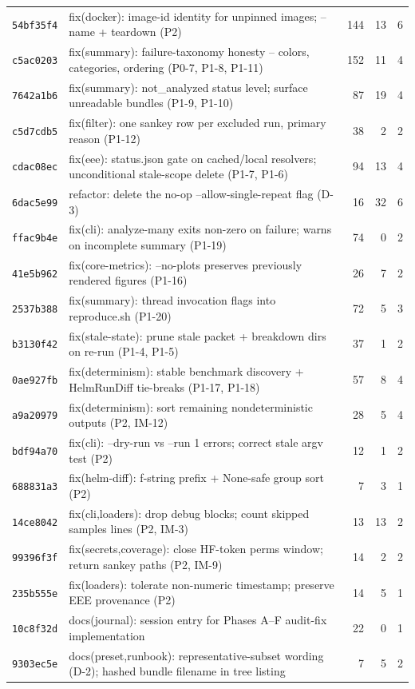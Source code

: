 \begin{longtable}{@{}p{}p{}r r r@{}}
\texttt{54bf35f4} & fix(docker): image-id identity for unpinned images; --name + teardown (P2) & 144 & 13 & 6 \\
\texttt{c5ac0203} & fix(summary): failure-taxonomy honesty -- colors, categories, ordering (P0-7, P1-8, P1-11) & 152 & 11 & 4 \\
\texttt{7642a1b6} & fix(summary): not\_analyzed status level; surface unreadable bundles (P1-9, P1-10) & 87 & 19 & 4 \\
\texttt{c5d7cdb5} & fix(filter): one sankey row per excluded run, primary reason (P1-12) & 38 & 2 & 2 \\
\texttt{cdac08ec} & fix(eee): status.json gate on cached/local resolvers; unconditional stale-scope delete (P1-7, P1-6) & 94 & 13 & 4 \\
\texttt{6dac5e99} & refactor: delete the no-op --allow-single-repeat flag (D-3) & 16 & 32 & 6 \\
\texttt{ffac9b4e} & fix(cli): analyze-many exits non-zero on failure; warns on incomplete summary (P1-19) & 74 & 0 & 2 \\
\texttt{41e5b962} & fix(core-metrics): --no-plots preserves previously rendered figures (P1-16) & 26 & 7 & 2 \\
\texttt{2537b388} & fix(summary): thread invocation flags into reproduce.sh (P1-20) & 72 & 5 & 3 \\
\texttt{b3130f42} & fix(stale-state): prune stale packet + breakdown dirs on re-run (P1-4, P1-5) & 37 & 1 & 2 \\
\texttt{0ae927fb} & fix(determinism): stable benchmark discovery + HelmRunDiff tie-breaks (P1-17, P1-18) & 57 & 8 & 4 \\
\texttt{a9a20979} & fix(determinism): sort remaining nondeterministic outputs (P2, IM-12) & 28 & 5 & 4 \\
\texttt{bdf94a70} & fix(cli): --dry-run vs --run 1 errors; correct stale argv test (P2) & 12 & 1 & 2 \\
\texttt{688831a3} & fix(helm-diff): f-string prefix + None-safe group sort (P2) & 7 & 3 & 1 \\
\texttt{14ce8042} & fix(cli,loaders): drop debug blocks; count skipped samples lines (P2, IM-3) & 13 & 13 & 2 \\
\texttt{99396f3f} & fix(secrets,coverage): close HF-token perms window; return sankey paths (P2, IM-9) & 14 & 2 & 2 \\
\texttt{235b555e} & fix(loaders): tolerate non-numeric timestamp; preserve EEE provenance (P2) & 14 & 5 & 1 \\
\texttt{10c8f32d} & docs(journal): session entry for Phases A--F audit-fix implementation & 22 & 0 & 1 \\
\texttt{9303ec5e} & docs(preset,runbook): representative-subset wording (D-2); hashed bundle filename in tree listing & 7 & 5 & 2 \\
\bottomrule\end{longtable}
